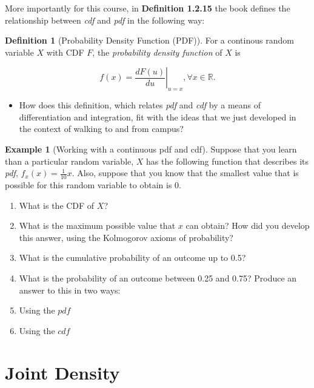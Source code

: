 \documentclass[
]{book}
\providecommand{\tightlist}{%
  \setlength{\itemsep}{0pt}\setlength{\parskip}{0pt}}
\theoremstyle{definition}
\newtheorem{definition}{Definition}[chapter]
\theoremstyle{definition}
\newtheorem{example}{Example}[chapter]
\theoremstyle{definition}
\theoremstyle{definition}
\theoremstyle{remark}
\begin{document}
More importantly for this course, in \textbf{Definition 1.2.15} the book defines the relationship between \emph{cdf} and \emph{pdf} in the following way:

\begin{definition}[Probability Density Function (PDF)]
For a continous random variable \(X\) with CDF \(F\), the \emph{probability density function} of \(X\) is

\[
  f(x) = \left. \frac{d F(u)}{du} \right|_{u=x}, \forall x \in \mathbb{R}.
\]
\end{definition}

\begin{itemize}
\tightlist
\item
  How does this definition, which relates \emph{pdf} and \emph{cdf} by a means of differentiation and integration, fit with the ideas that we just developed in the context of walking to and from campus?
\end{itemize}

\begin{example}[Working with a continuous pdf and cdf]

Suppose that you learn than a particular random variable, \(X\) has the following function that describes its \emph{pdf}, \(f_{x}(x) = \frac{1}{10}x\). Also, suppose that you know that the smallest value that is possible for this random variable to obtain is 0.

\begin{enumerate}
\def\labelenumi{\arabic{enumi}.}
\tightlist
\item
  What is the CDF of \(X\)?
\item
  What is the maximum possible value that \(x\) can obtain? How did you develop this answer, using the Kolmogorov axioms of probability?
\item
  What is the cumulative probability of an outcome up to 0.5?
\item
  What is the probability of an outcome between 0.25 and 0.75? Produce an answer to this in two ways:
\item
  Using the \(pdf\)
\item
  Using the \(cdf\)
\end{enumerate}

\end{example}

\hypertarget{joint-density}{%
\section{Joint Density}\label{joint-density}}
\end{document}
